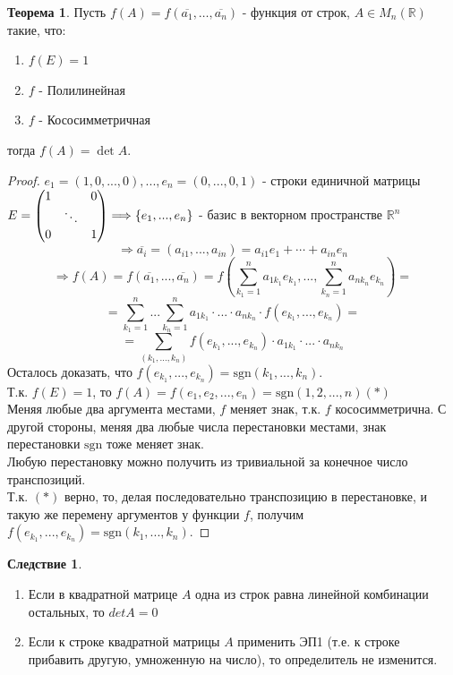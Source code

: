 \documentclass[a4paper, 12pt]{article}
\newcommand{\R}{\mathbb R}
\newcommand\tab[1][.5cm]{\hspace*{#1}}
\newcounter{thcount}
\theoremstyle{definition}
\newtheorem*{consequense}{Следствие}
\newtheorem{theoremnum}[thcount]{Теорема}
\begin{document}
  \begin{theoremnum}
    Пусть $f(A)=f(\overline{a_1},\dots,\overline{a_n})$ - функция от строк, $A\in M_n(\R)$ такие, что:
    \begin{enumerate}
      \item $f(E)=1$
      \item $f$ - Полилинейная
      \item $f$ - Кососимметричная
    \end{enumerate}
      тогда $f(A)=\det{A}$.
  \end{theoremnum}
  \begin{proof}
    $e_1 = (1,0,...,0),...,e_n=(0,...,0,1)$ - строки единичной матрицы $E = \begin{pmatrix}
      1 & \null & 0\\
      \null & \ddots & \null \\
      0 & \null & 1
    \end{pmatrix} \Longrightarrow  \{e_1,...,e_n\}$ - базис в векторном пространстве $\R^n$ 
    $$\Longrightarrow \overline{a_i} = (a_{i1},...,a_{in}) = a_{i1}e_1 + \cdots + a_{in}e_n$$
    $$\Longrightarrow f(A) = f(\overline{a_1},...,\overline{a_n}) = f(\sum \limits_{k_1=1}^na_{1k_1}e_{k_1}, ..., \sum \limits_{k_n=1}^na_{nk_n}e_{k_n}) = $$
    $$= \sum \limits_{k_1=1}^n ... \sum \limits_{k_n=1}^n a_{1k_1}\cdot ... \cdot a_{nk_n}\cdot f(e_{k_1},...,e_{k_n}) =$$
    $$= \sum \limits_{(k_1,...,k_n)}f(e_{k_1},...,e_{k_n})\cdot a_{1k_1}\cdot ... \cdot a_{nk_n}$$ 
    Осталось доказать, что $f(e_{k_1},...,e_{k_n}) = \textrm{sgn}(k_1,...,k_n)$. \\
    Т.к. $f(E) =1$, то $f(A) = f(e_1,e_2,...,e_n) = \textrm{sgn}(1,2,...,n) (*)$   \\
    Меняя любые два аргумента местами, $f$ меняет знак, т.к. $f$ кососимметрична. С другой стороны, меняя два любые числа перестановки местами, знак перестановки $\textrm{sgn}$ тоже меняет знак. \\
    Любую перестановку можно получить из тривиальной за конечное число транспозиций. \\
    Т.к. $(*)$ верно, то, делая последовательно транспозицию в перестановке, и такую же перемену аргументов у функции $f$, получим $f(e_{k_1},...,e_{k_n}) = \textrm{sgn}(k_1,...,k_n)$. 
  \end{proof} 
  \begin{consequense} \tab
    \begin{enumerate}
      \item Если в квадратной матрице $A$ одна из строк равна линейной комбинации остальных, то $detA = 0$
      \item Если к строке квадратной матрицы $A$ применить ЭП1 (т.е. к строке прибавить другую, умноженную на число), то определитель не изменится. 
    \end{enumerate}
  \end{consequense} 
\end{document}
